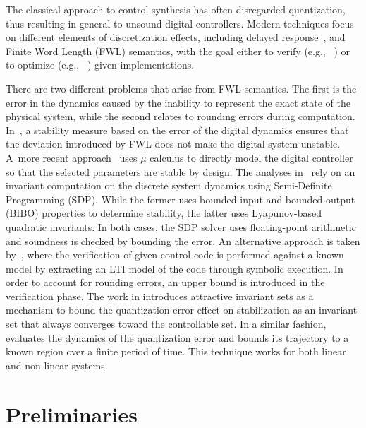 \documentclass[runningheads,a4paper]{llncs}
\newcommand{\addtodo}[1]{{\color{red} TODO: #1}}
\begin{document}
The classical approach to control synthesis has often disregarded
quantization, thus resulting in general to unsound digital controllers. 
Modern techniques focus on different elements of discretization effects,
including delayed response~\cite{Duggirala2015}, and Finite Word Length
(FWL) semantics, with the goal either to verify (e.g.,~ \cite{daes20161}) or
to optimize (e.g.,~ \cite{oudjida2014design}) given implementations.

There are two different problems that arise from FWL semantics.  The first
is the error in the dynamics caused by the inability to represent the exact
state of the physical system, while the second relates to rounding errors
during computation.  In~\cite{fialho1994stability}, a stability measure
based on the error of the digital dynamics ensures that the deviation
introduced by FWL does not make the digital system unstable.  A~more recent
approach~\cite{DBLP:journals/automatica/WuLCC09} uses $\mu$ calculus to
directly model the digital controller so that the selected parameters are
stable by design.  The analyses in~\cite{DBLP:conf/hybrid/RouxJG15,
DBLP:conf/hybrid/WangGRJF16} rely on an invariant computation on the
discrete system dynamics using Semi-Definite Programming (SDP).  While the
former uses bounded-input and bounded-output (BIBO) properties to determine stability, 
the latter uses Lyapunov-based quadratic invariants.  In both cases, the SDP solver uses
floating-point arithmetic and soundness is checked by bounding the error. 
An alternative approach is taken by~\cite{park2016scalable}, where the
verification of given control code is performed against a known model by
extracting an LTI model of the code through symbolic execution.  In order to
account for rounding errors, an upper bound is introduced in the
verification phase.  The work in \cite{picasso2003stabilization,
picasso2002construction} introduces attractive invariant sets as a mechanism
to bound the quantization error effect on stabilization as an invariant set
that always converges toward the controllable set.  In a similar fashion,
\cite{liberzon2003hybrid} evaluates the dynamics of the quantization error
and bounds its trajectory to a known region over a finite period of time. 
This technique works for both linear and non-linear systems.


\section{Preliminaries}
\label{sec:preliminaries}
\end{document}
